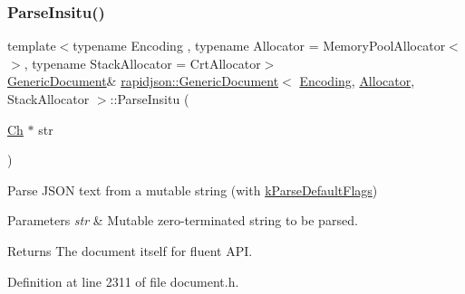 \subsubsection{\texorpdfstring{ParseInsitu()}{ParseInsitu()}\hspace{0.1cm}{\footnotesize\ttfamily [2/2]}}
{\footnotesize\ttfamily template$<$typename Encoding , typename Allocator  = Memory\+Pool\+Allocator$<$$>$, typename Stack\+Allocator  = Crt\+Allocator$>$ \\
\mbox{\hyperlink{classrapidjson_1_1_generic_document}{Generic\+Document}}\& \mbox{\hyperlink{classrapidjson_1_1_generic_document}{rapidjson\+::\+Generic\+Document}}$<$ \mbox{\hyperlink{classrapidjson_1_1_encoding}{Encoding}}, \mbox{\hyperlink{classrapidjson_1_1_allocator}{Allocator}}, Stack\+Allocator $>$\+::Parse\+Insitu (\begin{DoxyParamCaption}\item[{\mbox{\hyperlink{classrapidjson_1_1_generic_value_adcdbc7fa85a9a41b78966d7e0dcc2ac4}{Ch}} $\ast$}]{str }\end{DoxyParamCaption})}



Parse J\+S\+ON text from a mutable string (with \mbox{\hyperlink{namespacerapidjson_a81379eb4e94a0386d71d15fda882ebc9a5640cb00db7814b7f22be3683dda9835}{k\+Parse\+Default\+Flags}}) 


\begin{DoxyParams}{Parameters}
{\em str} & Mutable zero-\/terminated string to be parsed. \\
\hline
\end{DoxyParams}
\begin{DoxyReturn}{Returns}
The document itself for fluent A\+PI. 
\end{DoxyReturn}


Definition at line 2311 of file document.\+h.


\begin{DoxyCode}{0}

\end{DoxyCode}
\mbox{\label{classrapidjson_1_1_generic_document_a3ae97682cf04685c7db9d89ebc399b85}} 
